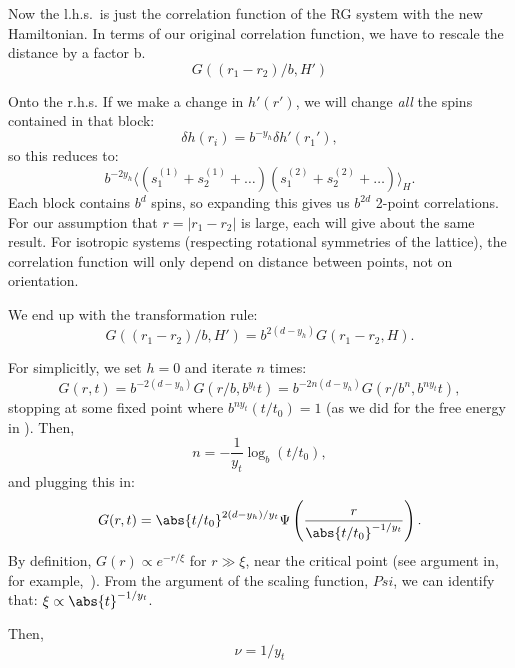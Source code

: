 Now the l.h.s.\ is just the correlation function of the RG system with
the new Hamiltonian. In terms of our original correlation function, we
have to rescale the distance by a factor b.
\begin{equation}
  G((r_1-r_2)/b, H')
\end{equation}

Onto the r.h.s. If we make a change in $h'(r')$, we will change
\textit{all} the spins contained in that block:
\begin{equation}
  \delta h(r_i)=b^{-y_h} \delta h'(r_1'),
\end{equation}
so this reduces to:
\begin{equation}
  b^{-2y_h}\langle (s_1^{(1)}+ s_2^{(1)}+\dots)(s_1^{(2)}+ s_2^{(2)}+\dots) \rangle_H.
\end{equation}
Each block contains $b^d$ spins, so expanding this gives us $b^{2d}$
2-point correlations. For our assumption that $r=\rvert r_1-r_2\rvert$
is large, each will give about the same result. For isotropic systems
(respecting rotational symmetries of the lattice), the correlation
function will only depend on distance between points, not on
orientation.

We end up with the transformation rule:%
\begin{equation}
  G((r_1-r_2)/b,H')=b^{2(d-y_h)}G(r_1-r_2,H).
\end{equation}

For simplicitly, we set $h=0$ and iterate $n$ times:
\begin{equation}
  G(r,t)=b^{-2(d-y_h)}G(r/b, b^{y_t}t)=b^{-2n(d-y_h)}G(r/b^n, b^{ny_t}t),
\end{equation}
stopping at some fixed point where $b^{ny_t}(t/t_0)=1$ (as we did for
the free energy in ).  Then,
\begin{equation}
  n = -\frac{1}{y_t}\log_b(t/t_0),
\end{equation}
and plugging this in:
\begin{equation}
  G(r,t)=\abs{t/t_0}^{2(d-y_h)/y_t} \Psi\left(\frac{r}{\abs{t/t_0}^{-1/y_t}}\right).
\end{equation}
By definition, $G(r)\propto e^{-r/\xi}$ for $r\gg\xi$, near the
critical point (see argument in, for example,~\cite{cardy}).  From the
argument of the scaling function, $Psi$, we can identify that:
$\xi \propto \abs{t}^{-1/y_t}$.

Then,
\begin{equation}
  \nu=1/y_t
\end{equation}
